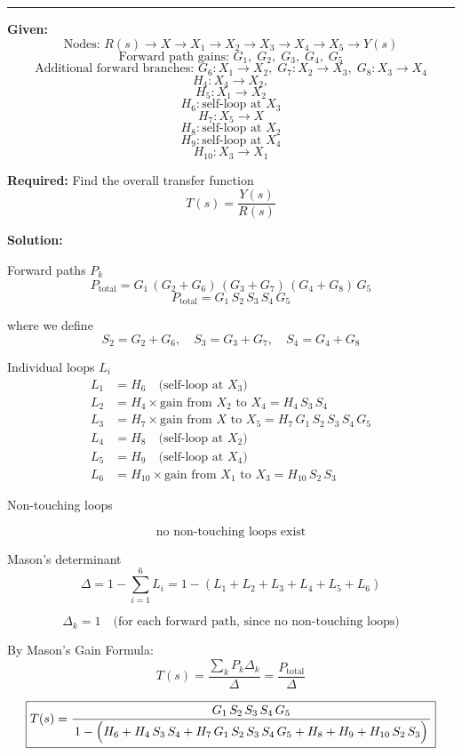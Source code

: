 \noindent\rule{\textwidth}{1pt}

\textbf{Given:}
\[
\text{Nodes: } R(s) \longrightarrow X \longrightarrow X_1 \longrightarrow X_2 \longrightarrow X_3 \longrightarrow X_4 \longrightarrow X_5 \longrightarrow Y(s)
\]
\[
\text{Forward path gains: } G_1,\; G_2,\; G_3,\; G_4,\; G_5
\]
\[
\text{Additional forward branches: } G_6: X_1 \to X_2,\; G_7: X_2 \to X_3,\; G_8: X_3 \to X_4
\]
\[
H_4 : X_4 \to X_2,
\]
\[
H_5 : X_1 \to X_2
\]
\[
H_6 : \text{self-loop at } X_3
\]
\[
H_7 : X_5 \to X
\]
\[
H_8 : \text{self-loop at } X_2
\]
\[
H_9 : \text{self-loop at } X_4
\]
\[
H_{10} : X_3 \to X_1
\]

\textbf{Required:} Find the overall transfer function
\[
T(s) = \frac{Y(s)}{R(s)}
\]

\textbf{Solution:}

Forward paths \(P_k\)
\[
P_{\text{total}} = G_1 \,(G_2 + G_6)\,(G_3 + G_7)\,(G_4 + G_8)\,G_5
\]
\[
P_{\text{total}} = G_1 \, S_2 \, S_3 \, S_4 \, G_5
\]

where we define
\[
S_2 = G_2 + G_6, \quad S_3 = G_3 + G_7, \quad S_4 = G_4 + G_8
\]

Individual loops \(L_i\)
\begin{align*}
L_1 &= H_6 \quad \text{(self-loop at } X_3 \text{)} \\
L_2 &= H_4 \times \text{gain from } X_2 \text{ to } X_4 = H_4 \, S_3 \, S_4 \\
L_3 &= H_7 \times \text{gain from } X \text{ to } X_5 = H_7 \, G_1 \, S_2 \, S_3 \, S_4 \, G_5 \\
L_4 &= H_8 \quad \text{(self-loop at } X_2 \text{)} \\
L_5 &= H_9 \quad \text{(self-loop at } X_4 \text{)} \\
L_6 &= H_{10} \times \text{gain from } X_1 \text{ to } X_3 = H_{10} \, S_2 \, S_3
\end{align*}

\newpage
Non-touching loops

\[\text{no non-touching loops exist}\]

Mason's determinant
\[
\Delta = 1 - \sum_{i=1}^{6} L_i
= 1 - (L_1 + L_2 + L_3 + L_4 + L_5 + L_6)
\]

\[
\Delta_k = 1 \quad \text{(for each forward path, since no non-touching loops)}
\]

By Mason's Gain Formula:
\[
T(s) = \frac{\sum_k P_k \Delta_k}{\Delta} = \frac{P_{\text{total}}}{\Delta}
\]

\[
\boxed{%
T(s) = \frac{G_1\,S_2\,S_3\,S_4\,G_5}
{\,1 - \Big(H_6 + H_4\,S_3\,S_4 + H_7\,G_1\,S_2\,S_3\,S_4\,G_5 + H_8 + H_9 + H_{10}\,S_2\,S_3 \Big)\,}
}
\]

